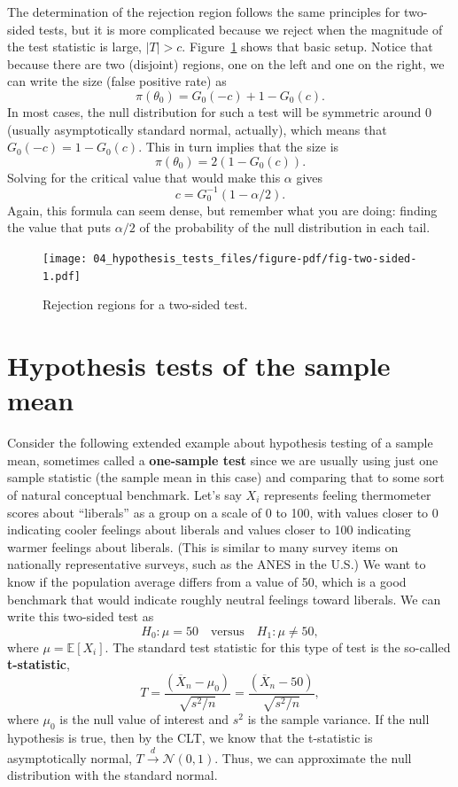 \documentclass[
  letterpaper,
  DIV=11,
  numbers=noendperiod]{scrreprt}
\newcommand{\E}{\mathbb{E}}
\newcommand{\N}{\mathcal{N}}
\newcommand{\Xbar}{\overline{X}}
\newcommand{\indist}{\overset{d}{\to}}
\theoremstyle{plain}
\theoremstyle{definition}
\theoremstyle{definition}
\theoremstyle{remark}
\begin{document}
The determination of the rejection region follows the same principles
for two-sided tests, but it is more complicated because we reject when
the magnitude of the test statistic is large, \(|T| > c\).
Figure~\ref{fig-two-sided} shows that basic setup. Notice that because
there are two (disjoint) regions, one on the left and one on the right,
we can write the size (false positive rate) as \[ 
\pi(\theta_0) = G_0(-c) + 1 - G_0(c).
\] In most cases, the null distribution for such a test will be
symmetric around 0 (usually asymptotically standard normal, actually),
which means that \(G_0(-c) = 1 - G_0(c)\). This in turn implies that the
size is \[ 
\pi(\theta_0) = 2(1 - G_0(c)).
\] Solving for the critical value that would make this \(\alpha\) gives
\[ 
c = G^{-1}_0(1 - \alpha/2).
\] Again, this formula can seem dense, but remember what you are doing:
finding the value that puts \(\alpha/2\) of the probability of the null
distribution in each tail.

\begin{figure}[th]

{\centering \texttt{[image: 04\_hypothesis\_tests\_files/figure-pdf/fig-two-sided-1.pdf]}

}

\caption{\label{fig-two-sided}Rejection regions for a two-sided test.}

\end{figure}

\hypertarget{hypothesis-tests-of-the-sample-mean}{%
\section{Hypothesis tests of the sample
mean}\label{hypothesis-tests-of-the-sample-mean}}

Consider the following extended example about hypothesis testing of a
sample mean, sometimes called a \textbf{one-sample test} since we are
usually using just one sample statistic (the sample mean in this case)
and comparing that to some sort of natural conceptual benchmark. Let's
say \(X_i\) represents feeling thermometer scores about ``liberals'' as
a group on a scale of 0 to 100, with values closer to 0 indicating
cooler feelings about liberals and values closer to 100 indicating
warmer feelings about liberals. (This is similar to many survey items on
nationally representative surveys, such as the ANES in the U.S.) We want
to know if the population average differs from a value of 50, which is a
good benchmark that would indicate roughly neutral feelings toward
liberals. We can write this two-sided test as \[
H_0: \mu = 50 \quad\text{versus}\quad H_1: \mu \neq 50,
\] where \(\mu = \E[X_i]\). The standard test statistic for this type of
test is the so-called \textbf{t-statistic}, \[ 
T = \frac{\left( \Xbar_n - \mu_0 \right)}{\sqrt{s^2 / n}} =\frac{\left( \Xbar_n - 50 \right)}{\sqrt{s^2 / n}},
\] where \(\mu_0\) is the null value of interest and \(s^2\) is the
sample variance. If the null hypothesis is true, then by the CLT, we
know that the t-statistic is asymptotically normal,
\(T \indist \N(0, 1)\). Thus, we can approximate the null distribution
with the standard normal.
\end{document}
